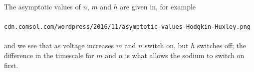 \documentclass[a4paper,12pt]{article}
\begin{document}
\begin{enumerate}
The asymptotic values of $n$, $m$ and $h$ are given in, for example\\
\\
\texttt{cdn.comsol.com/wordpress/2016/11/asymptotic-values-Hodgkin-Huxley.png}\\
\\
and we see that as voltage increases $m$ and $n$ switch on, but $h$ switches off; the difference in the timescale for $m$ and $n$ is what allows the sodium to switch on first.
 \fi

\end{enumerate}
\end{document}
